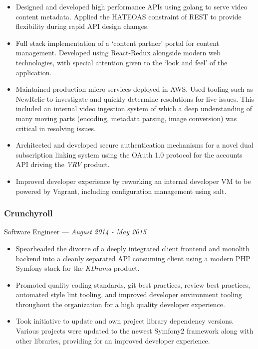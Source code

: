 \documentclass[letterpaper,10pt]{article}
\begin{document}
\begin{itemize}
\tightlist{}
\item
  Designed and developed high performance APIs using golang to serve
  video content metadata. Applied the HATEOAS constraint of REST to provide
  flexibility during rapid API design changes.
\item
  Full stack implementation of a `content partner' portal for content
  management. Developed using React-Redux alongside modern web technologies,
  with special attention given to the `look and feel' of the application.
\item
  Maintained production micro-services deployed in AWS\@. Used tooling such as
  NewRelic to investigate and quickly determine resolutions for live issues.
  This included an internal video ingestion system of which a deep
  understanding of many moving parts (encoding, metadata parsing, image
  conversion) was critical in resolving issues.
\item
  Architected and developed secure authentication mechanisms for a novel
  dual subscription linking system using the OAuth 1.0 protocol for the
  accounts API driving the \emph{VRV} product.
\item
  Improved developer experience by reworking an internal developer VM to be
  powered by Vagrant, including configuration management using salt.
\end{itemize}

\subsubsection{Crunchyroll}
\hfill Software Engineer --- \emph{August 2014 - May 2015}

\begin{itemize}
\tightlist{}
\item
  Spearheaded the divorce of a deeply integrated client frontend and monolith
  backend into a cleanly separated API consuming client using a modern PHP
  Symfony stack for the \emph{KDrama} product.
\item
  Promoted quality coding standards, git best practices, review best
  practices, automated style lint tooling, and improved developer environment
  tooling throughout the organization for a high quality developer
  experience.
\item
  Took initiative to update and own project library dependency versions.
  Various projects were updated to the newest Symfony2 framework along with
  other libraries, providing for an improved developer experience.
\end{itemize}
\end{document}
